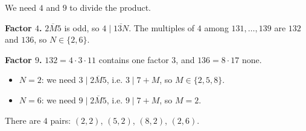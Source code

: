We need $4$ and $9$ to divide the product.

\textbf{Factor $4$.} $\overline{2M5}$ is odd, so $4\mid\overline{13N}$. The multiples of $4$ among $131,\dots,139$ are $132$ and $136$, so $N\in\{2,6\}$.

\textbf{Factor $9$.} $132=4\cdot3\cdot11$ contains one factor $3$, and $136=8\cdot17$ none.
\begin{itemize}
\item $N=2$: we need $3\mid\overline{2M5}$, i.e. $3\mid7+M$, so $M\in\{2,5,8\}$.
\item $N=6$: we need $9\mid\overline{2M5}$, i.e. $9\mid7+M$, so $M=2$.
\end{itemize}
There are $\boxed{4}$ pairs: $(2,2)$, $(5,2)$, $(8,2)$, $(2,6)$.
